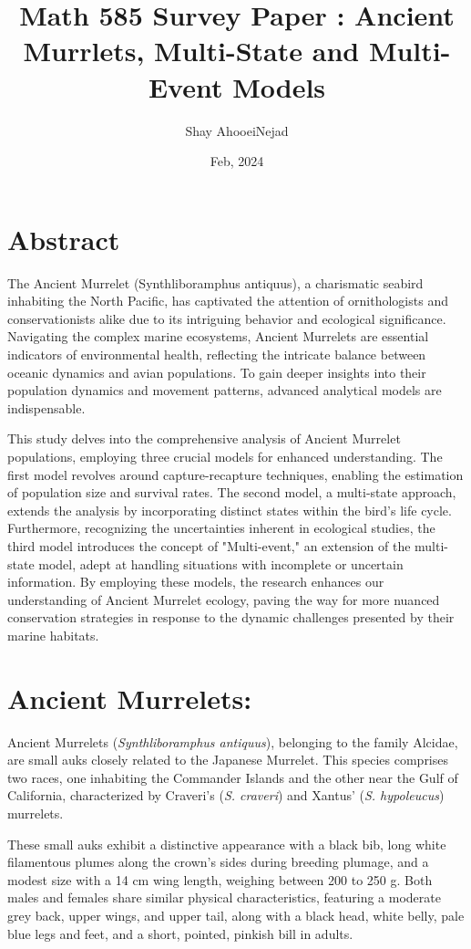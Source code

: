 \documentclass{article}
\title{Math 585 Survey Paper : Ancient Murrlets, Multi-State and Multi-Event Models}
\author{Shay AhooeiNejad}
\date{Feb, 2024}
\begin{document}
\maketitle
\section{Abstract}

The Ancient Murrelet (Synthliboramphus antiquus), a charismatic seabird inhabiting the North Pacific, has captivated the attention of ornithologists and conservationists alike due to its intriguing behavior and ecological significance. Navigating the complex marine ecosystems, Ancient Murrelets are essential indicators of environmental health, reflecting the intricate balance between oceanic dynamics and avian populations. To gain deeper insights into their population dynamics and movement patterns, advanced analytical models are indispensable.

This study delves into the comprehensive analysis of Ancient Murrelet populations, employing three crucial models for enhanced understanding. The first model revolves around capture-recapture techniques, enabling the estimation of population size and survival rates. The second model, a multi-state approach, extends the analysis by incorporating distinct states within the bird's life cycle. Furthermore, recognizing the uncertainties inherent in ecological studies, the third model introduces the concept of "Multi-event," an extension of the multi-state model, adept at handling situations with incomplete or uncertain information. By employing these models, the research enhances our understanding of Ancient Murrelet ecology, paving the way for more nuanced conservation strategies in response to the dynamic challenges presented by their marine habitats.

\section{Ancient Murrelets:}

Ancient Murrelets (\textit{Synthliboramphus antiquus}), belonging to the family Alcidae, are small auks closely related to the Japanese Murrelet. This species comprises two races, one inhabiting the Commander Islands and the other near the Gulf of California, characterized by Craveri’s (\textit{S. craveri}) and Xantus’ (\textit{S. hypoleucus}) murrelets.\cite{bc_ancient_murrelet}

These small auks exhibit a distinctive appearance with a black bib, long white filamentous plumes along the crown's sides during breeding plumage, and a modest size with a 14 cm wing length, weighing between 200 to 250 g. Both males and females share similar physical characteristics, featuring a moderate grey back, upper wings, and upper tail, along with a black head, white belly, pale blue legs and feet, and a short, pointed, pinkish bill in adults.\cite{bc_ancient_murrelet}
\end{document}
